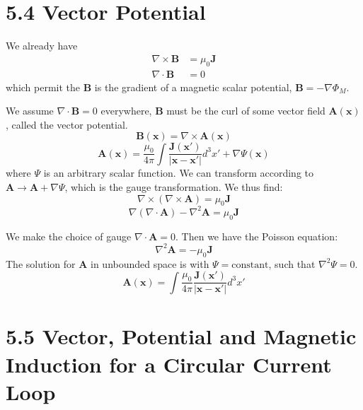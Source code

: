 \documentclass{article}
\begin{document}
	\section*{5.4 Vector Potential}
	
	We already have
	\begin{align*}
		\nabla \times \mathbf{B} &= \mu_0 \mathbf{J} \\
		\nabla \cdot \mathbf{B} &= 0
	\end{align*}
	which permit the $\mathbf{B}$ is the gradient of a magnetic scalar potential, $\mathbf{B} = -\nabla \Phi_M$.
	
	We assume $\nabla \cdot \mathbf{B} = 0$ everywhere, $\mathbf{B}$ must be the curl of some vector field $\mathbf{A}(\mathbf{x})$, called the vector potential.
	\begin{equation*}
		\mathbf{B}(\mathbf{x}) = \nabla \times \mathbf{A}(\mathbf{x})
	\end{equation*}
	\begin{equation*}
		\mathbf{A}(\mathbf{x}) = \frac{\mu_0}{4\pi} \int \frac{\mathbf{J}(\mathbf{x'})}{|\mathbf{x}-\mathbf{x'}|} d^3x' + \nabla \Psi(\mathbf{x})
	\end{equation*}
	where $\Psi$ is an arbitrary scalar function. We can transform according to $\mathbf{A} \rightarrow \mathbf{A} + \nabla \Psi$, which is the gauge transformation.
	We thus find:
	\begin{equation*}
		\nabla \times (\nabla \times \mathbf{A}) = \mu_0 \mathbf{J}
	\end{equation*}
	\begin{equation*}
		\nabla(\nabla \cdot \mathbf{A}) - \nabla^2 \mathbf{A} = \mu_0 \mathbf{J}
	\end{equation*}
	
	We make the choice of gauge $\nabla \cdot \mathbf{A} = 0$.
	Then we have the Poisson equation:
	\begin{equation*}
		\nabla^2 \mathbf{A} = -\mu_0 \mathbf{J}
	\end{equation*}
	The solution for $\mathbf{A}$ in unbounded space is with $\Psi = \text{constant}$, such that $\nabla^2 \Psi = 0$.
	\begin{equation*}
		\mathbf{A}(\mathbf{x}) = \int \frac{\mu_0}{4\pi} \frac{\mathbf{J}(\mathbf{x'})}{|\mathbf{x}-\mathbf{x'}|} d^3x'
	\end{equation*}
	
	
	\section*{5.5 Vector, Potential and Magnetic Induction for a Circular Current Loop}
	
\end{document}
